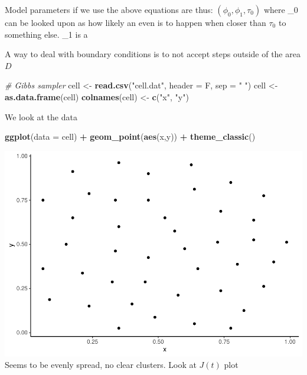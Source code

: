 \documentclass[
]{article}
\newenvironment{Shaded}{\begin{snugshade}}{\end{snugshade}}
\newcommand{\CommentTok}[1]{\textcolor[rgb]{0.56,0.35,0.01}{\textit{#1}}}
\newcommand{\DataTypeTok}[1]{\textcolor[rgb]{0.13,0.29,0.53}{#1}}
\newcommand{\KeywordTok}[1]{\textcolor[rgb]{0.13,0.29,0.53}{\textbf{#1}}}
\newcommand{\NormalTok}[1]{#1}
\newcommand{\OperatorTok}[1]{\textcolor[rgb]{0.81,0.36,0.00}{\textbf{#1}}}
\newcommand{\StringTok}[1]{\textcolor[rgb]{0.31,0.60,0.02}{#1}}
\begin{document}
Model parameters if we use the above equations are thus:
\((\phi_0, \phi_1, \tau_0)\) where \phi\_0 can be looked upon as how
likely an even is to happen when closer than \(\tau_0\) to something
else. \phi\_1 is a

A way to deal with boundary conditions is to not accept steps outside of
the area \(D\)

\begin{Shaded}
\begin{Highlighting}[]
\CommentTok{# Gibbs sampler}
\NormalTok{cell <-}\StringTok{ }\KeywordTok{read.csv}\NormalTok{(}\StringTok{"cell.dat"}\NormalTok{, }\DataTypeTok{header =}\NormalTok{ F, }\DataTypeTok{sep =} \StringTok{" "}\NormalTok{)}
\NormalTok{cell <-}\StringTok{ }\KeywordTok{as.data.frame}\NormalTok{(cell)}
\KeywordTok{colnames}\NormalTok{(cell) <-}\StringTok{ }\KeywordTok{c}\NormalTok{(}\StringTok{"x"}\NormalTok{, }\StringTok{"y"}\NormalTok{)}
\end{Highlighting}
\end{Shaded}

We look at the data

\begin{Shaded}
\begin{Highlighting}[]
\KeywordTok{ggplot}\NormalTok{(}\DataTypeTok{data =}\NormalTok{ cell) }\OperatorTok{+}\StringTok{ }\KeywordTok{geom_point}\NormalTok{(}\KeywordTok{aes}\NormalTok{(x,y)) }\OperatorTok{+}\StringTok{ }\KeywordTok{theme_classic}\NormalTok{()}
\end{Highlighting}
\end{Shaded}

\includegraphics{project2_files/figure-latex/unnamed-chunk-19-1.pdf}
Seems to be evenly spread, no clear clusters. Look at \(J(t)\) plot
\end{document}
